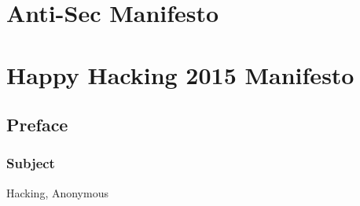 \documentclass[letterpaper,12pt,english]{sphinxmanual}
\begin{document}
\chapter{Anti-Sec Manifesto}
\label{anti-sec::doc}\label{anti-sec:anti-sec-manifesto}


\chapter{Happy Hacking 2015 Manifesto}
\label{happy-hacking::doc}\label{happy-hacking:happy-hacking-2015-manifesto}\label{happy-hacking:index-0}

\section{Preface}
\label{happy-hacking:preface}

\subsection{Subject}
\label{happy-hacking:subject}
Hacking, Anonymous
\end{document}
